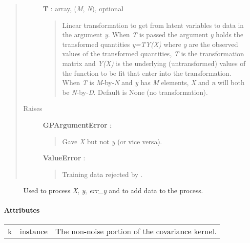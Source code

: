 \documentclass[letterpaper,10pt,english]{sphinxmanual}
\begin{document}
\begin{fulllineitems}
\begin{quote}
\begin{description}
\textbf{T} : array, (\emph{M}, \emph{N}), optional
\begin{quote}

Linear transformation to get from latent variables to data in the
argument \emph{y}. When \emph{T} is passed the argument \emph{y} holds the transformed
quantities \emph{y=TY(X)} where \emph{y} are the observed values of the
transformed quantities, \emph{T} is the transformation matrix and \emph{Y(X)} is
the underlying (untransformed) values of the function to be fit that
enter into the transformation. When \emph{T} is \emph{M}-by-\emph{N} and \emph{y} has \emph{M}
elements, \emph{X} and \emph{n} will both be \emph{N}-by-\emph{D}. Default is None (no
transformation).
\end{quote}

\item[{Raises}] \leavevmode
\textbf{GPArgumentError} :
\begin{quote}

Gave \emph{X} but not \emph{y} (or vice versa).
\end{quote}

\textbf{ValueError} :
\begin{quote}

Training data rejected by {\hyperref[gptools:gptools.gaussian_process.GaussianProcess.add_data]{}}.
\end{quote}

\end{description}\end{quote}



\begin{description}
\item[{{\hyperref[gptools:gptools.gaussian_process.GaussianProcess.add_data]{}}}] \leavevmode
Used to process \emph{X}, \emph{y}, \emph{err\_y} and to add data to the process.

\end{description}


\paragraph{Attributes}

\begin{tabulary}{\linewidth}{|L|L|L|}
\hline

k
 & 
{\hyperref[gptools.kernel:gptools.kernel.core.Kernel]{}} instance
 & 
The non-noise portion of the covariance kernel.
\\


\end{tabulary}
\end{fulllineitems}
\end{document}
